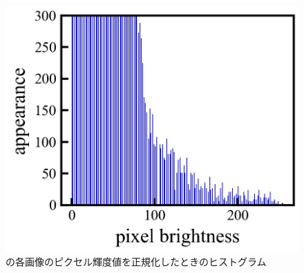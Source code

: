 \begin{figure}[h]
\begin{center}
		\begin{minipage}{0.3\linewidth}
			\includegraphics[width=0.98\columnwidth]{./theory/figure/5/norm_hist_2.jpg}
		\end{minipage}
	\end{center}
	\caption{の各画像のピクセル輝度値を正規化したときのヒストグラム}
	\label{fig:norm_hist}
\end{figure}

